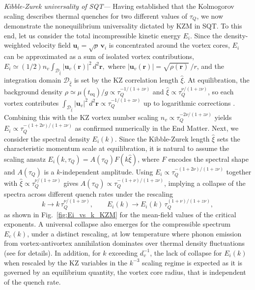 \documentclass[aps,prl,twocolumn,showpacs,notitlepage,floatfix,superscriptaddress]{revtex4-1}
\begin{document}
{\it Kibble-Zurek universality of SQT---}
Having established that the Kolmogorov scaling describes thermal quenches for two different values of $\tau_Q$, we now demonstrate the nonequilibrium universality dictated by KZM in SQT.
To this end, let us consider the total incompressible kinetic energy 
$E_i$. 
Since the density-weighted velocity field $\boldsymbol{u}_{i}=\sqrt{\rho}\,\boldsymbol{v}_{i}$ is concentrated around the vortex cores, $E_i$ can be approximated as a sum of isolated vortex contributions,
$
E_i 
\simeq
\left( 
1
/ 2 \right) 
n_v 
\!\int_{\mathcal{D}_{\hat{\xi}}}\!
\left\vert 
\boldsymbol{u}_v(\boldsymbol{r})
\right\vert^2 
\,d^2\boldsymbol{r},
$
where \(
\left\vert 
\boldsymbol{u}_v(\boldsymbol{r})
\right\vert 
=\sqrt{\rho(\boldsymbol{r})}\, 
/ r
\), and the integration domain \(\mathcal{D}_{\hat{\xi}}\) is set by the KZ correlation length \(\hat{\xi}\).  
At equilibration, the background density \( \rho \simeq \mu(t_{\textrm{eq}}) / g \propto 
\tau_Q^{- 1 / \left( 1 + z \nu \right)}
\) and \( \hat{\xi} \propto 
\tau_Q^{\nu / \left( 1 + z \nu \right)}
\), so each vortex contributes \( \int_{\mathcal{D}_{\hat{\xi}}} 
\left\vert 
\boldsymbol{u}_v 
\right\vert^2 
\, d^2\boldsymbol{r} \propto 
\tau_Q^{- 1 / \left( 1 + z \nu \right)}
\) up to logarithmic corrections \cite{SM}. Combining this with the KZ vortex number scaling \( n_v \propto 
\tau_Q^{- 2 \nu / \left( 1 + z \nu \right)}
\) yields \( E_i \propto 
\tau_Q^{- \left( 1 + 2 \nu \right) / \left( 1 + z \nu \right)}
\) as confirmed numerically in 
the End Matter. 
Next, we consider the spectral density $E_i(k)$. Since the Kibble-Zurek length $\hat{\xi}$ sets the characteristic momentum scale at equilibration, it is natural to assume the scaling ansatz $E_i(k,\tau_Q) = A(\tau_Q) F(k\hat{\xi})$, where $F$ encodes the spectral shape and $A(\tau_{Q})$ is a $k$-independent amplitude. Using $E_i \propto 
\tau_Q^{- \left( 1 + 2 \nu \right) / \left( 1 + z \nu \right)}$ together with $\hat{\xi} \propto \tau_Q^{\nu / \left( 1 + z \nu \right)}$ gives $A(\tau_Q) \propto \tau_Q^{- \left( 1 + \nu \right) / \left( 1 + z \nu \right)}$, implying a collapse of the spectra across different quench rates under the rescaling
\begin{equation}
k \to k\, \tau_Q^{\nu / \left( 1 + z \nu \right)}
, \qquad 
E_i(k) \to E_i(k)\, \tau_Q^{\left( 1 + \nu \right) / \left( 1 + z \nu \right)}
,
\label{Ei_scaling}
\end{equation}
as shown in Fig.~\ref{fig:Ei_vs_k_KZM} for the mean-field values of the critical exponents. 
A universal collapse also emerges for the compressible spectrum $E_c(k)$, under a distinct rescaling, at low temperature where phonon emission from vortex-antivortex annihilation 
\cite{Kumar2025} 
dominates over thermal density fluctuations (see \cite{SM} for details).
In addition, for $k$ exceeding $d_v^{-1}$, the lack of collapse for $E_i(k)$ when rescaled by the KZ variables in the $k^{-3}$ scaling regime is expected as it is governed by an equilibrium quantity, the vortex core radius, that is independent of the quench rate. 
\end{document}

